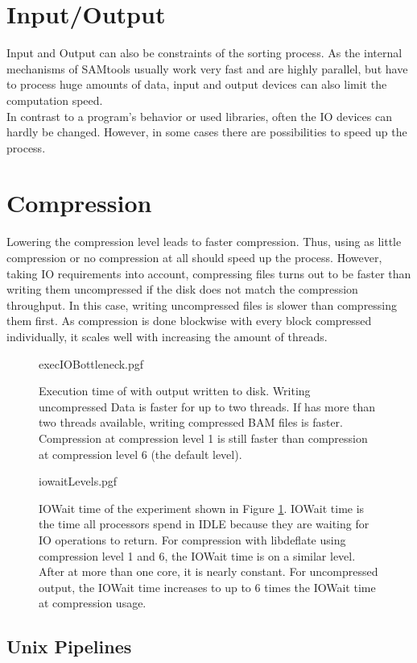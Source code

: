 \section{Input/Output} 
Input and Output can also be constraints of the sorting process. As the internal mechanisms of SAMtools usually work very fast and are highly parallel, but have to process huge amounts of data, input and output devices can also limit the computation speed. \\
In contrast to a program's behavior or used libraries, often the IO devices can hardly be changed. However, in some cases there are possibilities to speed up the process.

\section{Compression}
Lowering the compression level leads to faster compression. Thus, using as little compression or no compression at all should speed up the process. However, taking IO requirements into account, compressing files turns out to be faster than writing them uncompressed if the disk does not match the compression throughput. In this case, writing uncompressed files is slower than compressing them first. As compression is done blockwise with every block compressed individually, it scales well with increasing the amount of threads.
\begin{figure}[t]
        {execIOBottleneck.pgf}
    \caption{Execution time of \sort with output written to disk. Writing uncompressed Data is faster for up to two threads. If \sort has more than two threads available, writing compressed BAM files is faster. Compression at compression level 1 is still faster than compression at compression level 6 (the default level).}
    \label{fig:execIO}
\end{figure}
\begin{figure}
        {iowaitLevels.pgf}
    \caption{IOWait time of the experiment shown in Figure \ref{fig:execIO}. IOWait time is the time all processors spend in IDLE because they are waiting for IO operations to return. For compression with libdeflate using compression level 1 and 6, the IOWait time is on a similar level. After at more than one core, it is nearly constant. For uncompressed output, the IOWait time increases to up to 6 times the IOWait time at compression usage. }
    \label{fig:iowait}
\end{figure}


\subsection{Unix Pipelines}

